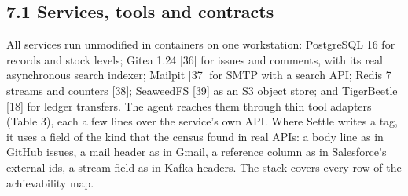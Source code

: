 \documentclass[
  10pt,
]{article}
\begin{document}
\hypertarget{services-tools-and-contracts}{%
\subsection*{7.1 Services, tools and
contracts}\label{services-tools-and-contracts}}

All services run unmodified in containers on one workstation: PostgreSQL
16 for records and stock levels; Gitea 1.24 {[}36{]} for issues and
comments, with its real asynchronous search indexer; Mailpit {[}37{]}
for SMTP with a search API; Redis 7 streams and counters {[}38{]};
SeaweedFS {[}39{]} as an S3 object store; and TigerBeetle {[}18{]} for
ledger transfers. The agent reaches them through thin tool adapters
(Table 3), each a few lines over the service's own API. Where Settle
writes a tag, it uses a field of the kind that the census found in real
APIs: a body line as in GitHub issues, a mail header as in Gmail, a
reference column as in Salesforce's external ids, a stream field as in
Kafka headers. The stack covers every row of the achievability map.
\end{document}
